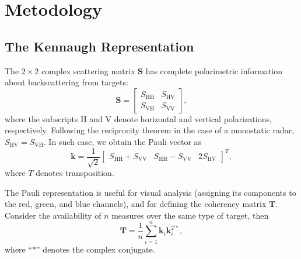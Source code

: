 \documentclass[journal]{IEEEtran}
\begin{document}
\section{Metodology}

\subsection{The Kennaugh Representation}

The $2 \times 2$ complex scattering matrix $\bm S$ has
complete polarimetric information about backscattering
from targets:
$$
\bm S = \begin{bmatrix}
S_{\text{HH}} &S_{\text{HV}}\\
S_{\text{VH}} &S_{\text{VV}}
\end{bmatrix},
$$
where the subscripts $\text{H}$ and $\text{V}$ denote horizontal and vertical
polarizations, respectively. 
Following the reciprocity theorem
in the case of a monostatic radar, 
$S_{\text{HV}}=S_{\text{VH}}$.
In such case, we obtain the Pauli vector as
$$
\bm k = \frac1{\sqrt{2}}
	\begin{bmatrix}
S_{\text{HH}} + S_{\text{VV}} 
& S_{\text{HH}} - S_{\text{VV}} 
& 2S_{\text{HV}}
	\end{bmatrix}^T,
$$
where $T$ denotes transposition.

The Pauli representation is useful for visual analysis (assigning its components to the red, green, and blue channels), and for defining the coherency matrix $\bm T$.
Consider the availability of $n$ measures over the same type of target, then
$$
\bm T = \frac{1}{n} \sum_{i=1}^{n}\bm k_i \bm k_i^{T*},
$$
where ``$*$'' denotes the complex conjugate.
\end{document}
